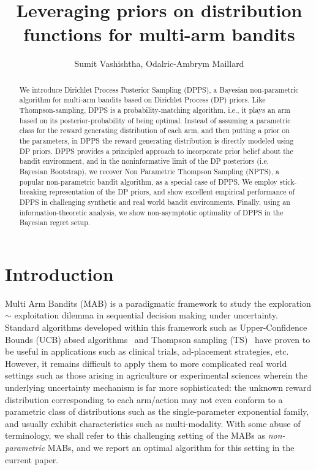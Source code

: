 \documentclass[10pt]{article}
\title{Leveraging priors on distribution functions for multi-arm bandits}
\author{Sumit Vashishtha, Odalric-Ambrym Maillard}
\begin{document}
\makeCover  %
\maketitle  %

\begin{abstract}
 We introduce Dirichlet Process Posterior Sampling (DPPS), a Bayesian non-parametric algorithm for multi-arm bandits based on Dirichlet Process (DP) priors. Like Thompson-sampling, DPPS is a probability-matching algorithm, i.e., it plays an arm based on its posterior-probability of being optimal. Instead of assuming a
parametric class for the reward generating distribution of each arm, and then putting a prior on the  parameters, in DPPS the reward generating distribution is directly modeled 
using DP priors. DPPS provides a principled approach to incorporate prior belief about the bandit environment, and in the noninformative limit of the DP posteriors (i.e. Bayesian Bootstrap), we recover Non Parametric Thompson Sampling (NPTS), a popular non-parametric bandit algorithm,  as a special case of DPPS. We employ stick-breaking representation of the DP priors, and show excellent empirical performance of DPPS in challenging synthetic and real world bandit environments. Finally,  using an information-theoretic analysis, we show non-asymptotic optimality of DPPS in the Bayesian regret setup. 

\end{abstract}



\section{Introduction}

Multi Arm Bandits (MAB) is a paradigmatic framework to study the exploration $\sim$ exploitation dilemma in sequential decision making under uncertainty. Standard algorithms developed within this framework such as Upper-Confidence Bounds (UCB) absed algorithms~\citep{auer2002finite} and Thompson sampling (TS)~\citep{thompson1933likelihood,russo2018tutorial} have proven to be useful in applications such as clinical trials, ad-placement strategies, etc. However, it remains difficult to apply them to more complicated real world settings such as those arising in agriculture or experimental sciences wherein the underlying uncertainty mechanism is far more sophisticated: the unknown reward distribution corresponding to each arm/action may not even conform to a parametric class of distributions such as the single-parameter exponential family, and usually exhibit characteristics such as multi-modality.  With some abuse of terminology, we shall refer to this challenging setting of the MABs as \textit{non-parametric} MABs, and we report an optimal algorithm for this setting in the current paper.  
\end{document}
